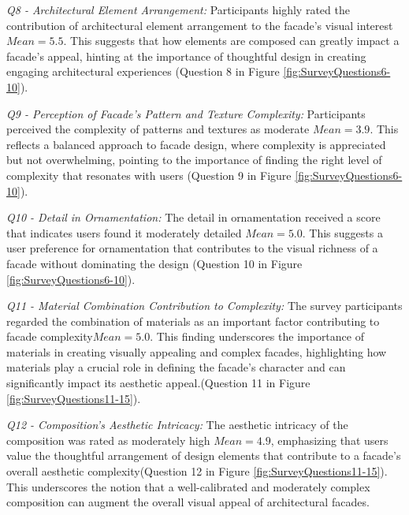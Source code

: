 \textit{Q8 - Architectural Element Arrangement:}
Participants highly rated the contribution of architectural element arrangement to the facade's visual interest \(Mean=5.5\).
This suggests that how elements are composed can greatly impact a facade's appeal, hinting at the importance of thoughtful design in creating engaging architectural experiences (Question 8 in Figure \ref{fig:SurveyQuestions6-10}).

\textit{Q9 - Perception of Facade's Pattern and Texture Complexity:}
Participants perceived the complexity of patterns and textures as moderate \(Mean=3.9\).
This reflects a balanced approach to facade design, where complexity is appreciated but not overwhelming, pointing to the importance of finding the right level of complexity that resonates with users (Question 9 in Figure \ref{fig:SurveyQuestions6-10}).

\textit{Q10 - Detail in Ornamentation:}
The detail in ornamentation received a score that indicates users found it moderately detailed \(Mean=5.0\).
This suggests a user preference for ornamentation that contributes to the visual richness of a facade without dominating the design (Question 10 in Figure \ref{fig:SurveyQuestions6-10}).

\textit{Q11 - Material Combination Contribution to Complexity:}
The survey participants regarded the combination of materials as an important factor contributing to facade complexity\(Mean=5.0\).
This finding underscores the importance of materials in creating visually appealing and complex facades, highlighting how materials play a crucial role in defining the facade's character and can significantly impact its aesthetic appeal.(Question 11 in Figure \ref{fig:SurveyQuestions11-15}).

\textit{Q12 - Composition's Aesthetic Intricacy:}
The aesthetic intricacy of the composition was rated as moderately high \(Mean=4.9\), emphasizing that users value the thoughtful arrangement of design elements that contribute to a facade's overall aesthetic complexity(Question 12 in Figure \ref{fig:SurveyQuestions11-15}). This underscores the notion that a well-calibrated and moderately complex composition can augment the overall visual appeal of architectural facades.

